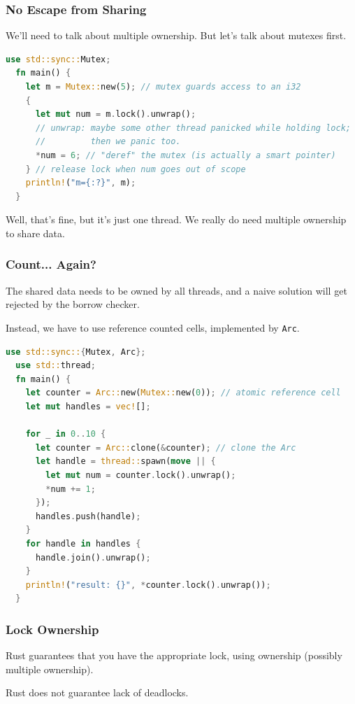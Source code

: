 \begin{frame}[fragile]
\frametitle{No Escape from Sharing}

We'll need to talk about multiple ownership. But let's talk about mutexes first.
\begin{lstlisting}[language=Rust]
  use std::sync::Mutex;
  fn main() {
    let m = Mutex::new(5); // mutex guards access to an i32
    {
      let mut num = m.lock().unwrap();
      // unwrap: maybe some other thread panicked while holding lock;
      //         then we panic too.
      *num = 6; // "deref" the mutex (is actually a smart pointer)
    } // release lock when num goes out of scope
    println!("m={:?}", m);
  }
\end{lstlisting}
Well, that's fine, but it's just one thread. We really do need multiple ownership
to share data.

\end{frame}


\begin{frame}[fragile]
\frametitle{Count... Again?}

 The shared data needs to be owned by all threads, and a naive solution
will get rejected by the borrow checker. 

Instead, we have to use \alert{reference counted
  cells}, implemented by {\tt Arc}.
\begin{lstlisting}[language=Rust]
  use std::sync::{Mutex, Arc};
  use std::thread;
  fn main() {
    let counter = Arc::new(Mutex::new(0)); // atomic reference cell
    let mut handles = vec![];

    for _ in 0..10 {
      let counter = Arc::clone(&counter); // clone the Arc
      let handle = thread::spawn(move || {
        let mut num = counter.lock().unwrap();
        *num += 1;
      });
      handles.push(handle);
    }
    for handle in handles {
      handle.join().unwrap();
    }
    println!("result: {}", *counter.lock().unwrap());
  }
\end{lstlisting}

\end{frame}


\begin{frame}
\frametitle{Lock Ownership}

Rust guarantees that you have the appropriate lock, using ownership (possibly multiple ownership).


Rust does not guarantee lack of deadlocks.


\end{frame}






